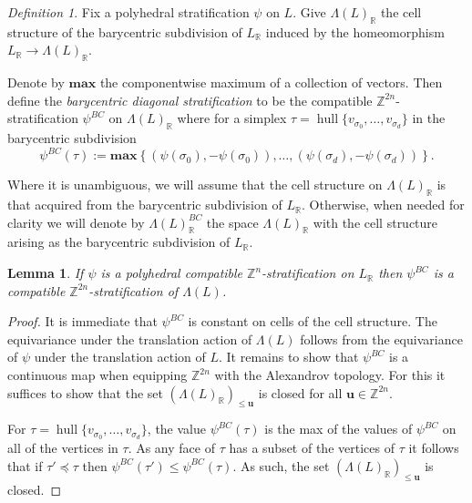 \documentclass{amsart}
\newcommand{\ZZ}{\mathbb{Z}}
\newcommand{\RR}{\mathbb{R}}
\DeclareMathOperator{\hull}{hull}
\newtheorem{lemma}[theorem]{Lemma}
\theoremstyle{remark}
\newtheorem{definition}[theorem]{Definition}
\begin{document}
\begin{definition}
  Fix a polyhedral stratification $\psi$ on $L$.
  Give $\Lambda(L)_{\RR}$ the cell structure of the barycentric subdivision of $L_{\RR}$
  induced by the homeomorphism $L_{\RR}\rightarrow \Lambda(L)_{\RR}$.

  Denote by $\mathbf{max}$ the componentwise maximum of a collection of vectors.
  Then define the \emph{barycentric diagonal stratification} to be the compatible $\ZZ^{2n}$-stratification
  $\psi^{BC}$ on $\Lambda(L)_{\RR}$ where for a simplex $\tau=\hull\{v_{\sigma_0},\ldots,v_{\sigma_d}\}$ in the barycentric subdivision
  \[\psi^{BC}(\tau) := \mathbf{max}\left\{(\psi(\sigma_0),-\psi(\sigma_0)), \ldots, (\psi(\sigma_d),-\psi(\sigma_d))\right\}.\]
\end{definition}

Where it is unambiguous, we will assume that the cell structure on $\Lambda(L)_{\RR}$ is that acquired from the barycentric subdivision of $L_{\RR}$.
Otherwise, when needed for clarity we will denote by $\Lambda(L)_{\RR}^{BC}$ the space $\Lambda(L)_{\RR}$ with the cell structure arising as the barycentric subdivision of $L_{\RR}$.

\begin{lemma}
  If $\psi$ is a polyhedral compatible $\ZZ^{n}$-stratification on $L_{\RR}$ then $\psi^{BC}$ is a compatible $\ZZ^{2n}$-stratification of $\Lambda(L)$.
\end{lemma}
\begin{proof}
  It is immediate that $\psi^{BC}$ is constant on cells of the cell structure.
  The equivariance under the translation action of $\Lambda(L)$ follows from
  the equivariance of $\psi$ under the translation action of $L$.
  It remains to show that $\psi^{BC}$ is a continuous map when equipping $\ZZ^{2n}$ with the Alexandrov topology.
  For this it suffices to show that the set $(\Lambda(L)_{\RR})_{\leq \bm{u}}$ is closed for all $\bm{u}\in \ZZ^{2n}$.

  For $\tau=\hull\{v_{\sigma_0},\ldots,v_{\sigma_d}\}$, the value $\psi^{BC}(\tau)$ is the max of the values of $\psi^{BC}$ on all of the vertices in $\tau$. As any face of $\tau$ has a subset of the vertices of $\tau$ it follows that if $\tau'\preceq \tau$ then $\psi^{BC}(\tau')\leq \psi^{BC}(\tau)$. As such, the set $(\Lambda(L)_{\RR})_{\leq \bm{u}}$ is closed.
\end{proof}
\end{document}
